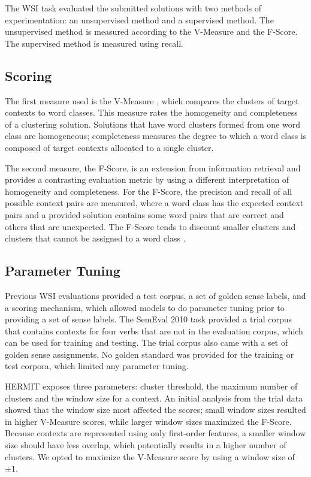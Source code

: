 \documentclass[11pt,a4]{article}
\begin{document}
The WSI task evaluated the submitted solutions with two methods of
experimentation: an unsupervised method and a supervised method.  The
unsupervised method is measured according to the V-Measure and the F-Score.  The
supervised method is measured using recall.

\subsection{Scoring}

The first measure used is the V-Measure \cite{rosenberg07vmeasure},
which compares the clusters of target contexts to word classes.  This measure
rates the homogeneity and completeness of a clustering solution.  Solutions that
have word clusters formed from one word class are homogeneous; completeness
measures the degree to which a word class is composed of target contexts
allocated to a single cluster.

The second measure, the F-Score, is an extension from information retrieval
and provides a contrasting evaluation metric by using a different
interpretation of homogeneity and completeness.  For the F-Score, the precision
and recall of all possible context pairs are measured, where a word class has
the expected context pairs and a provided solution contains some word pairs that
are correct and others that are unexpected.  The F-Score tends to discount
smaller clusters and clusters that cannot be assigned to a word class
\cite{manandhar09semeval}.

\subsection{Parameter Tuning}

Previous WSI evaluations provided a test corpus, a set of golden sense labels,
and a scoring mechanism, which allowed models to do parameter tuning prior to
providing a set of sense labels.  The SemEval 2010 task provided a trial corpus
that contains contexts for four verbs that are not in the evaluation corpus,
which can be used for training and testing.  The trial corpus also came with a
set of golden sense assignments.  No golden standard was provided for the
training or test corpora, which limited any parameter tuning.

HERMIT exposes three parameters: cluster threshold, the maximum number of
clusters and the window size for a context.  An initial analysis from the trial
data showed that the window size most affected the scores; small window sizes
resulted in higher V-Measure scores, while larger window sizes maximized the
F-Score.  Because
contexts are represented using only first-order features, a smaller window size
should have less overlap, which potentially results in a higher number of
clusters.  We opted to maximize the V-Measure score by using a window size of
$\pm 1$.
\end{document}
